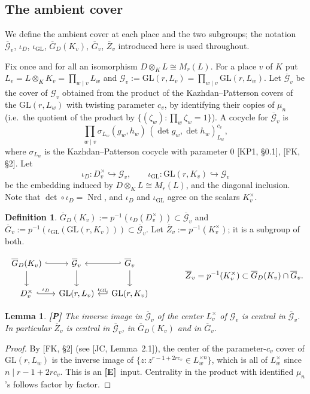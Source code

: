 \documentclass[12pt]{article}
\newcommand{\ov}[1]{\overline{#1}}
\newcommand{\Nrd}{\operatorname{Nrd}}
\newcommand{\GL}{\mathrm{GL}}
\newcommand{\Gb}{\ov{G}}
\newcommand{\Zb}{\ov{Z}}
\newcommand{\GDb}{\ov{G}_D}
\newcommand{\cG}{\mathcal{G}}
\newcommand{\cGb}{\ov{\mathcal{G}}}
\newcommand{\iD}{\iota_D}
\newcommand{\iG}{\iota_{\GL}}
\newcommand{\Pv}{\textbf{[P]}}
\newcommand{\Ev}{\textbf{[E]}}
\theoremstyle{plain}
\newtheorem{lemma}[theorem]{Lemma}
\theoremstyle{definition}
\newtheorem{definition}[theorem]{Definition}
\begin{document}
\subsection{The ambient cover}\label{subsec:ambient}
We define the ambient cover at each place and the two subgroups; the notation $\cGb_v$, $\iD$, $\iG$, $\GDb(K_v)$, $\Gb_v$, $\Zb_v$ introduced here is used throughout.

Fix once and for all an isomorphism $D\otimes_KL\cong M_r(L)$. For a place $v$ of $K$ put $L_v=L\otimes_KK_v=\prod_{w\mid v}L_w$ and $\cG_v:=\GL(r,L_v)=\prod_{w\mid v}\GL(r,L_w)$. Let $\cGb_v$ be the cover of $\cG_v$ obtained from the product of the Kazhdan--Patterson covers of the $\GL(r,L_w)$ with twisting parameter $c_v$, by identifying their copies of $\mu_n$ (i.e.\ the quotient of the product by $\{(\zeta_w):\prod_w\zeta_w=1\}$). A cocycle for $\cGb_v$ is
\begin{equation}\label{eq:ambient}
\prod_{w\mid v}\sigma_{L_w}(g_w,h_w)\,(\det g_w,\det h_w)_{L_w}^{c_v},
\end{equation}
where $\sigma_{L_w}$ is the Kazhdan--Patterson cocycle with parameter $0$ [KP1, \S0.1], [FK, \S2]. Let
\[ \iD:D_v^\times\hookrightarrow\cG_v,\qquad \iG:\GL(r,K_v)\hookrightarrow\cG_v \]
be the embedding induced by $D\otimes_KL\cong M_r(L)$, and the diagonal inclusion. Note that $\det\circ\iD=\Nrd$, and $\iD$ and $\iG$ agree on the scalars $K_v^\times$.

\begin{definition}\label{def:localcovers}
$\GDb(K_v):=p^{-1}(\iD(D_v^\times))\subset\cGb_v$ and $\Gb_v:=p^{-1}(\iG(\GL(r,K_v)))\subset\cGb_v$. Let $\Zb_v:=p^{-1}(K_v^\times)$; it is a subgroup of both.
\end{definition}

\begin{equation}\label{eq:diagram}
\begin{tikzcd}[column sep=small]
\GDb(K_v)\arrow[r,hook]\arrow[d] & \cGb_v\arrow[d] & \Gb_v\arrow[l,hook']\arrow[d]\\
D_v^\times\arrow[r,hook,"\iD"] & \GL(r,L_v) & \GL(r,K_v)\arrow[l,hook',"\iG"']
\end{tikzcd}
\qquad\qquad \Zb_v=p^{-1}(K_v^\times)\subset\GDb(K_v)\cap\Gb_v.
\end{equation}

\begin{lemma}\label{lem:center}\Pv
The inverse image in $\cGb_v$ of the center $L_v^\times$ of $\cG_v$ is central in $\cGb_v$. In particular $\Zb_v$ is central in $\cGb_v$, in $\GDb(K_v)$ and in $\Gb_v$.
\end{lemma}
\begin{proof}
By [FK, \S2] (see [JC, Lemma~2.1]), the center of the parameter-$c_v$ cover of $\GL(r,L_w)$ is the inverse image of $\{z:z^{r-1+2rc_v}\in L_w^{\times n}\}$, which is all of $L_w^\times$ since $n\mid r-1+2rc_v$. This is an \Ev\ input. Centrality in the product with identified $\mu_n$'s follows factor by factor.
\end{proof}
\end{document}
